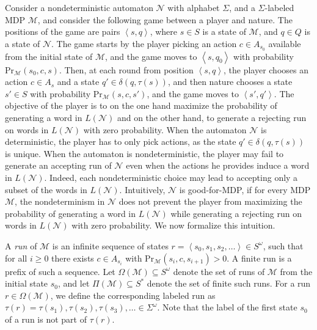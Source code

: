 \documentclass[10pt,a4paper]{amsart}
\theoremstyle{definition}
\numberwithin{equation}{section}
\newcommand{\M}{{\mathcal M}}
\newcommand{\zug}[1]{\left\langle #1 \right\rangle}
\renewcommand{\Pr}{\mathrm{Pr}}
\newcommand{\N}{{\mathcal N}}
\begin{document}
Consider a nondeterministic automaton $\N$ with alphabet $\Sigma$, and a $\Sigma$-labeled MDP $\M$, and consider the following game between a player and nature. The positions of the game are pairs $\zug{s,q}$, where $s\in S$ is a state of $\M$, and $q\in Q$ is a state of $\N$. The game starts by the player picking an action $c\in A_{s_0}$ available from the initial state of $\M$, and the game moves to $\zug{s,q_0}$ with probability $\Pr_\M(s_0,c,s)$. Then, at each round from position $\zug{s,q}$, the player chooses an action $c\in A_s$ and a state $q'\in \delta(q,\tau(s))$, and then nature chooses a state $s'\in S$ with probability $\Pr_\M(s,c,s')$, and the game moves to $\zug{s',q'}$. 
The objective of the player is to on the one hand maximize the probability of generating a word in $L(\N)$ and on the other hand, to generate a rejecting run on words in $L(\N)$ with zero probability.
When the automaton $\N$ is deterministic, the player has to only pick actions, as the state $q'\in \delta(q,\tau(s))$ is unique. When the automaton is nondeterministic, the player may fail to generate an accepting run of $\N$ even when the actions he provides induce a word in $L(\N)$. Indeed, each nondeterministic choice may lead to accepting only a subset of the words in $L(\N)$. 
Intuitively, $\N$ is good-for-MDP, if for every MDP $\M$, the nondeterminism in $\N$ does not prevent the player from maximizing the probability of generating a word in $L(\N)$ while generating a rejecting run on words in $L(\N)$ with zero probability. We now formalize this intuition.

A {\em run\/} of $\M$ is an infinite sequence of states $r=\zug{s_0,s_1,s_2,\ldots}\in S^\omega$, such that for all $i\geq 0$ there exists $c\in A_{s_i}$ with $\Pr_\M(s_i,c,s_{i+1}) > 0$. A finite run is a prefix of such a sequence. Let $\Omega(\M)\subseteq S^\omega$ denote the set of runs of $\M$ from the initial state $s_0$, and let $\Pi(\M)\subseteq S^*$ denote the set of finite such runs. 
For a run $r\in \Omega(\M)$, we define the corresponding labeled run as $\tau(r) = \tau(s_1),\tau(s_2),\tau(s_3),\ldots\in \Sigma^\omega$. Note that the label of the first state $s_0$ of a run is not part of $\tau(r)$. 
\end{document}
